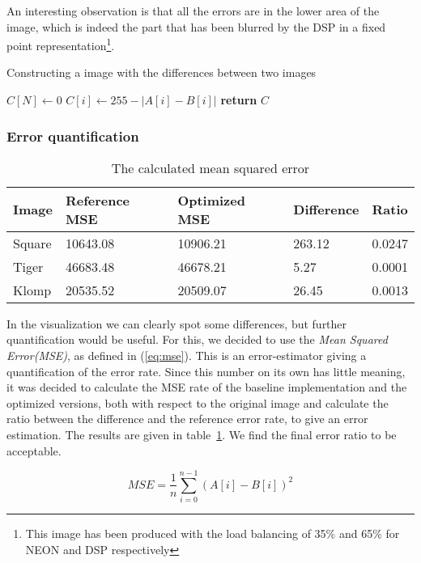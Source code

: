 An interesting observation is that all the errors are in the lower area of the image, which is indeed the part that has been blurred by the DSP in a fixed point representation\footnote{This image has been produced with the load balancing of 35\% and 65\% for NEON and DSP respectively}.

\begin{algorithm}[t]
    \caption{Constructing a image with the differences between two images}\label{alg:imgdiff}
    \begin{algorithmic}[1]
        \State $C[N]\gets 0$
           \State $C[i]\gets 255 - |A[i] - B[i]|$
        \EndFor
        \State \textbf{return} $C$
        \EndProcedure
    \end{algorithmic}
\end{algorithm}

\subsubsection{Error quantification}



\begin{table}
    \centering
    \begin{tabular}{l | l l l l}
    Image   & Reference MSE & Optimized MSE & Difference    & Ratio     \\
    \hline
    Square  & 10643.08      & 10906.21      & 263.12        & 0.0247    \\
    Tiger   & 46683.48      & 46678.21      &   5.27        & 0.0001    \\
    Klomp   & 20535.52      & 20509.07      &  26.45        & 0.0013
    \end{tabular}
    \caption{The calculated mean squared error}
    \label{tab:mse}
\end{table}

In the visualization we can clearly spot some differences, but further quantification would be useful. For this, we decided to use the \emph{Mean Squared Error(MSE)}, as defined in (\ref{eq:mse}). This is an error-estimator giving a quantification of the error rate. Since this number on its own has little meaning, it was decided to calculate the MSE rate of the baseline implementation and the optimized versions, both with respect to the original image and calculate the ratio between the difference and the reference error rate, to give an error estimation. The results are given in table~\ref{tab:mse}. We find the final error ratio to be acceptable.

\begin{equation}
    MSE = \frac{1}{n} \sum_{i=0}^{n-1} (A[i] - B[i])^{2}
    \label{eq:mse}
\end{equation}